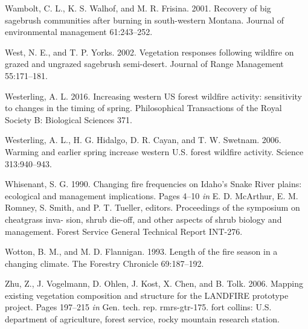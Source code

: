 \documentclass[12pt,]{article}
\begin{document}
\hypertarget{ref-Wambolt2001}{}
Wambolt, C. L., K. S. Walhof, and M. R. Frisina. 2001. Recovery of big
sagebrush communities after burning in south-western Montana. Journal of
environmental management 61:243--252.

\hypertarget{ref-West2002}{}
West, N. E., and T. P. Yorks. 2002. Vegetation responses following
wildfire on grazed and ungrazed sagebrush semi-desert. Journal of Range
Management 55:171--181.

\hypertarget{ref-Westerling2016}{}
Westerling, A. L. 2016. Increasing western US forest wildfire activity:
sensitivity to changes in the timing of spring. Philosophical
Transactions of the Royal Society B: Biological Sciences 371.

\hypertarget{ref-Westerling2006}{}
Westerling, A. L., H. G. Hidalgo, D. R. Cayan, and T. W. Swetnam. 2006.
Warming and earlier spring increase western U.S. forest wildfire
activity. Science 313:940--943.

\hypertarget{ref-Whisenant1990}{}
Whisenant, S. G. 1990. Changing fire frequencies on Idaho's Snake River
plains: ecological and management implications. Pages 4--10 \emph{in} E.
D. McArthur, E. M. Romney, S. Smith, and P. T. Tueller, editors.
Proceedings of the symposium on cheatgrass inva- sion, shrub die-off,
and other aspects of shrub biology and management. Forest Service
General Technical Report INT-276.

\hypertarget{ref-Wotton1993}{}
Wotton, B. M., and M. D. Flannigan. 1993. Length of the fire season in a
changing climate. The Forestry Chronicle 69:187--192.

\hypertarget{ref-Zhu2006}{}
Zhu, Z., J. Vogelmann, D. Ohlen, J. Kost, X. Chen, and B. Tolk. 2006.
Mapping existing vegetation composition and structure for the LANDFIRE
prototype project. Pages 197--215 \emph{in} Gen. tech. rep.
rmrs-gtr-175. fort collins: U.S. department of agriculture, forest
service, rocky mountain research station.
\end{document}

